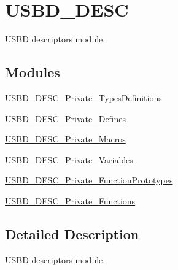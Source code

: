 \hypertarget{group___u_s_b_d___d_e_s_c}{}\section{U\+S\+B\+D\+\_\+\+D\+E\+SC}
\label{group___u_s_b_d___d_e_s_c}


U\+S\+BD descriptors module.  


\subsection*{Modules}
\begin{DoxyCompactItemize}
\item 
\hyperlink{group___u_s_b_d___d_e_s_c___private___types_definitions}{U\+S\+B\+D\+\_\+\+D\+E\+S\+C\+\_\+\+Private\+\_\+\+Types\+Definitions}
\item 
\hyperlink{group___u_s_b_d___d_e_s_c___private___defines}{U\+S\+B\+D\+\_\+\+D\+E\+S\+C\+\_\+\+Private\+\_\+\+Defines}
\item 
\hyperlink{group___u_s_b_d___d_e_s_c___private___macros}{U\+S\+B\+D\+\_\+\+D\+E\+S\+C\+\_\+\+Private\+\_\+\+Macros}
\item 
\hyperlink{group___u_s_b_d___d_e_s_c___private___variables}{U\+S\+B\+D\+\_\+\+D\+E\+S\+C\+\_\+\+Private\+\_\+\+Variables}
\item 
\hyperlink{group___u_s_b_d___d_e_s_c___private___function_prototypes}{U\+S\+B\+D\+\_\+\+D\+E\+S\+C\+\_\+\+Private\+\_\+\+Function\+Prototypes}
\item 
\hyperlink{group___u_s_b_d___d_e_s_c___private___functions}{U\+S\+B\+D\+\_\+\+D\+E\+S\+C\+\_\+\+Private\+\_\+\+Functions}
\end{DoxyCompactItemize}


\subsection{Detailed Description}
U\+S\+BD descriptors module. 

